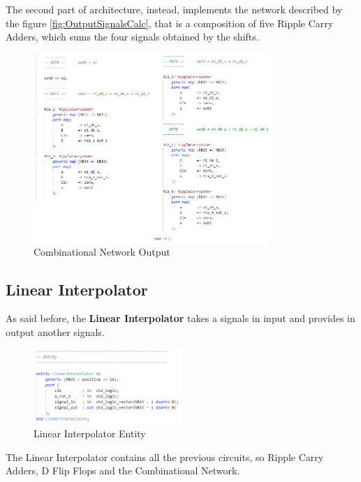 The second part of architecture, instead, implements the network described by the figure \ref{fig:OutputSignalsCalc}, that is a composition of five  Ripple Carry Adders, which sums the four signals obtained by the shifts.

\begin{figure}[H]
    \centering
    \includegraphics[width=0.8\textwidth]{img/Chapter3/CombInterp-out.png}
    \caption{Combinational Network Output}
    \label{fig:CNA3}
\end{figure}

\newpage

\subsection{Linear Interpolator}

As said before, the \textbf{Linear Interpolator} takes a signals in input and provides in output another signals.

\begin{figure}[H]
    \centering
    \includegraphics[width=0.5\textwidth]{img/Chapter3/LinearInterpolator-entity.png}
    \caption{Linear Interpolator Entity}
    \label{fig:LIE}
\end{figure}

The Linear Interpolator contains all the previous circuits, so Ripple Carry Adders, D Flip Flops and the Combinational Network.

